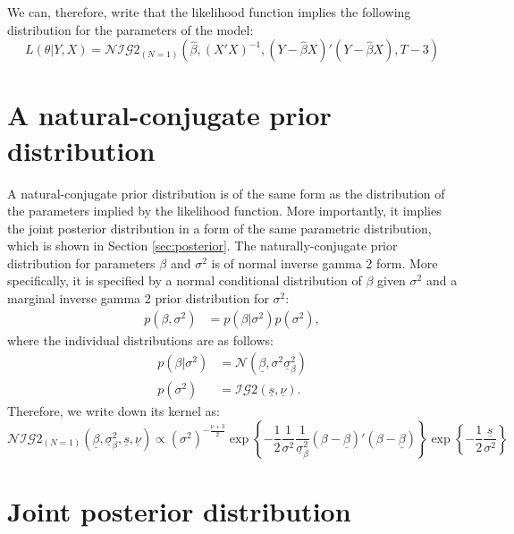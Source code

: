 \documentclass[
  letterpaper,
  DIV=11,
  numbers=noendperiod]{scrreprt}
\begin{document}
We can, therefore, write that the likelihood function implies the
following distribution for the parameters of the model: \begin{equation}
L\left(\theta|Y,X\right) = \mathcal{NIG}2_{(N=1)}\left(\hat\beta, (X'X)^{-1}, (Y-\hat\beta X)'(Y-\hat\beta X),  T-3 \right)
\end{equation}

\hypertarget{a-natural-conjugate-prior-distribution}{%
\section{A natural-conjugate prior
distribution}\label{a-natural-conjugate-prior-distribution}}

A natural-conjugate prior distribution is of the same form as the
distribution of the parameters implied by the likelihood function. More
importantly, it implies the joint posterior distribution in a form of
the same parametric distribution, which is shown in Section
\ref{sec:posterior}. The naturally-conjugate prior distribution for
parameters \(\beta\) and \(\sigma^2\) is of normal inverse gamma 2 form.
More specifically, it is specified by a normal conditional distribution
of \(\beta\) given \(\sigma^2\) and a marginal inverse gamma 2 prior
distribution for \(\sigma^2\): \begin{align}
p\left(\beta, \sigma^2\right) &= p\left(\beta|\sigma^2\right)p\left(\sigma^2\right),
\end{align} where the individual distributions are as follows:
\begin{align}
p\left(\beta|\sigma^2\right)&=\mathcal{N}\left( \underline{\beta}, \sigma^2\underline{\sigma}_{\beta}^2 \right)\\
p\left(\sigma^2\right)&=\mathcal{IG}2(\underline{s},\underline{\nu}).
\end{align} Therefore, we write down its kernel as:
\begin{equation}\label{eq:prior}
\mathcal{NIG}2_{(N=1)}\left(\underline{\beta}, \underline{\sigma}_{\beta}^2, \underline{s},\underline{\nu} \right) \propto \left(\sigma^2\right)^{-\frac{\underline{\nu}+3}{2}}\exp\left\{ -\frac{1}{2}\frac{1}{\sigma^2}\frac{1}{\underline{\sigma}_{\beta}^2}(\beta-\underline{\beta})'(\beta-\underline{\beta}) \right\}
\exp\left\{ -\frac{1}{2}\frac{\underline{s}}{\sigma^2} \right\}
\end{equation}

\hypertarget{joint-posterior-distribution}{%
\section{Joint posterior
distribution}\label{joint-posterior-distribution}}
\end{document}
